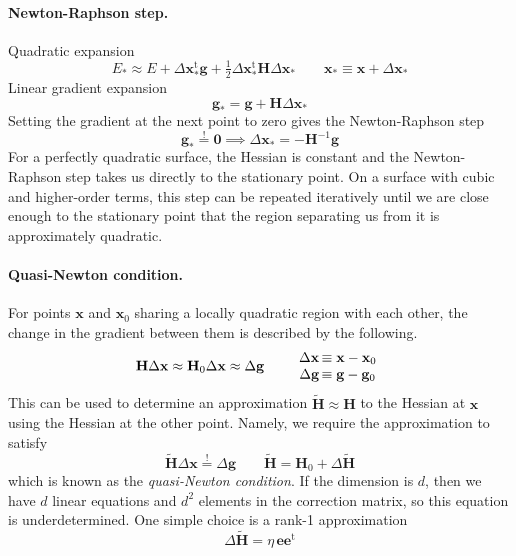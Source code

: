 \documentclass[11pt]{article}
\begin{document}
\paragraph{Newton-Raphson step.}
Quadratic expansion
\[
    E_*
    \approx
    E
    +
    \Delta\mathbf{x}_*^\mathrm{t}
    \mathbf{g}
    +
    \tfrac{1}{2}
    \Delta\mathbf{x}_*^\mathrm{t}
    \mathbf{H}
    \Delta\mathbf{x}_*
    \qquad
    \mathbf{x}_*
    \equiv
    \mathbf{x}
    +
    \Delta\mathbf{x}_*
\]
Linear gradient expansion
\[
    \mathbf{g}_*
    =
    \mathbf{g}
    +
    \mathbf{H}
    \Delta\mathbf{x}_*
\]
Setting the gradient at the next point to zero gives the Newton-Raphson step
\[
    \mathbf{g}_*
    \overset{!}{=}
    \mathbf{0}
    \implies
    \Delta\mathbf{x}_*
    =
    -
    \mathbf{H}^{-1}
    \mathbf{g}
\]
For a perfectly quadratic surface, the Hessian is constant and the
Newton-Raphson step takes us directly to the stationary point.
On a surface with cubic and higher-order terms, this step can be repeated
iteratively until we are close enough to the stationary point that the region
separating us from it is approximately quadratic.


\paragraph{Quasi-Newton condition.}
For points
\(
    \mathbf{x}
\)
and
\(
    \mathbf{x}_0
\)
sharing a locally quadratic region with each other, the change in the gradient
between them is described by the following.
\[
    \mathbf{H}
    \Delta\mathbf{x}
    \approx
    \mathbf{H}_0
    \Delta\mathbf{x}
    \approx
    \Delta\mathbf{g}
    \qquad
    \begin{array}{r@{\,}l}
        \Delta\mathbf{x}
        &\equiv
        \mathbf{x} - \mathbf{x}_0
        \\
        \Delta\mathbf{g}
        &\equiv
        \mathbf{g} - \mathbf{g}_0
    \end{array}
\]
This can be used to determine an approximation
\(
    \tilde{\mathbf{H}}
    \approx
    \mathbf{H}
\)
to the Hessian at
\(
    \mathbf{x}
\)
using the Hessian at the other point.
Namely, we require the approximation to satisfy
\[
    \tilde{\mathbf{H}}
    \Delta\mathbf{x}
    \overset{!}{=}
    \Delta\mathbf{g}
    \qquad
    \tilde{\mathbf{H}}
    =
    \mathbf{H}_0
    +
    \Delta\tilde{\mathbf{H}}
\]
which is known as the {\itshape quasi-Newton condition}.
If the dimension is \(d\), then we have \(d\) linear equations and \(d^2\)
elements in the correction matrix, so this equation is underdetermined.
One simple choice is a rank-1 approximation 
\[
    \Delta\tilde{\mathbf{H}}
    =
    \eta\,
    \mathbf{e}
    \mathbf{e}^\mathrm{t}
\]
\end{document}
